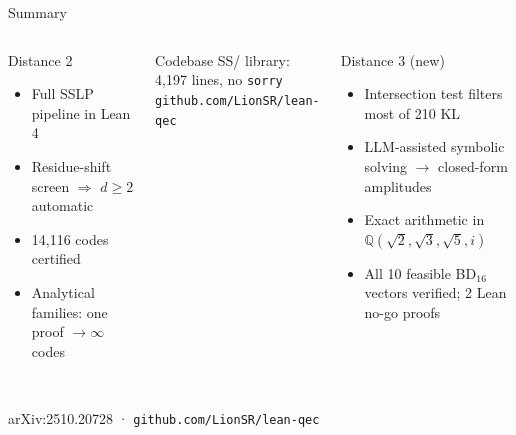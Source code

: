 \documentclass[aspectratio=169,t,10pt]{beamer}
\newcommand{\QQ}{\mathbb{Q}}
\newcommand{\code}[1]{\texttt{\small #1}}
\begin{document}
\begin{frame}{Summary}

\begin{columns}[T]
\begin{block}{Distance 2}
\begin{itemize}\setlength\itemsep{0pt}
\item Full SSLP pipeline in Lean 4
\item Residue-shift screen $\Rightarrow$ $d{\geq}2$ automatic
\item 14,116 codes certified
\item Analytical families: one proof $\to \infty$ codes
\end{itemize}
\end{block}

\begin{exampleblock}{Codebase}
SS/ library: 4,197 lines,\; no \code{sorry}\\
\code{github.com/LionSR/lean-qec}
\end{exampleblock}

\begin{block}{Distance 3 (new)}
\begin{itemize}\setlength\itemsep{0pt}
\item Intersection test filters most of 210 KL
\item LLM-assisted symbolic solving $\to$ closed-form amplitudes
\item Exact arithmetic in $\QQ(\sqrt{2},\sqrt{3},\sqrt{5},i)$
\item All 10 feasible BD$_{16}$ vectors verified; 2 Lean no-go proofs
\end{itemize}
\end{block}
\end{columns}

\end{frame}

{
\begin{frame}[standout]
  \textcolor{white}{\large Thank you}\\
  \textcolor{Ice}{\normalsize
    arXiv:2510.20728 \quad·\quad
    \texttt{github.com/LionSR/lean-qec}}
\end{frame}
}
\end{document}
